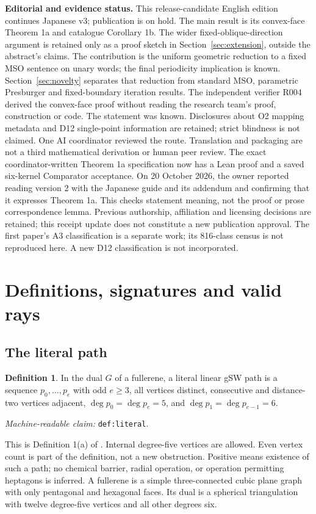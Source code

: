 \documentclass[11pt]{amsart}
\newcommand{\record}[1]{\nolinkurl{#1}}
\newcommand{\claimid}[1]{\par\nopagebreak\noindent\textit{Machine-readable claim:} \record{#1}.\par}
\theoremstyle{definition}\newtheorem{definition}{Definition}
\begin{document}
\noindent\textbf{Editorial and evidence status.}
This release-candidate English edition continues Japanese v3; publication is on hold. The
main result is its convex-face Theorem 1a and catalogue Corollary 1b.
The wider fixed-oblique-direction argument is retained only as a proof
sketch in Section~\ref{sec:extension}, outside the abstract's claims.
The contribution is the uniform geometric reduction to a fixed MSO
sentence on unary words; the final periodicity implication is known.
Section~\ref{sec:novelty} separates that reduction from standard
MSO, parametric Presburger and fixed-boundary iteration results.
The independent verifier R004 derived the convex-face proof without
reading the research team's proof, construction or code. The statement
was known. Disclosures about O2 mapping metadata and D12 single-point
information are retained; strict blindness is not claimed. One AI
coordinator reviewed the route. Translation and packaging are not a
third mathematical derivation or human peer review. The exact
coordinator-written Theorem 1a specification now has a Lean proof
and a saved six-kernel Comparator acceptance. On 20 October 2026,
the owner reported reading version 2 with the Japanese guide and its
addendum and confirming that it expresses Theorem 1a. This checks
statement meaning, not the proof or prose correspondence lemma. Previous
authorship, affiliation and licensing decisions are retained; this
receipt update does not constitute a new publication approval. The first paper's
A3 classification is a separate work; its 816-class census is not
reproduced here. A new D12 classification is not incorporated.

\clearpage
\section{Definitions, signatures and valid rays}\label{sec:definitions}
\subsection{The literal path}
\begin{definition}\label{def:literal}
In the dual $G$ of a fullerene, a literal linear gSW path is a sequence
$p_0,\ldots,p_e$ with odd $e\ge3$, all vertices distinct, consecutive
and distance-two vertices adjacent, $\deg p_0=\deg p_e=5$, and
$\deg p_1=\deg p_{e-1}=6$.
\end{definition}
\claimid{def:literal}
This is Definition 1(a) of \cite{BBS}. Internal degree-five vertices
are allowed. Even vertex count is part of the definition, not a new
obstruction. Positive means existence of such a path; no chemical
barrier, radial operation, or operation permitting heptagons is inferred.
A fullerene is a simple three-connected cubic plane graph with only
pentagonal and hexagonal faces. Its dual is a spherical triangulation
with twelve degree-five vertices and all other degrees six.
\end{document}
